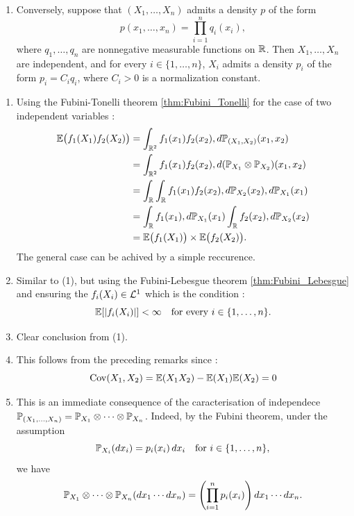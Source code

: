 \documentclass[../Main.tex]{subfiles}
\begin{document}
{\begin{enumerate}
\item Conversely, suppose that $(X_1,\dots,X_n)$ admits a density $p$ of the form
\[ p(x_1,\dots,x_n)=\prod_{i=1}^n q_i(x_i), \]
where $q_1,\dots,q_n$ are nonnegative measurable functions on $\mathbb{R}$. Then $X_1,\dots,X_n$ are independent, and for every $i\in\{1,\dots,n\}$, $X_i$ admits a density $p_i$ of the form $p_i=C_i q_i$, where $C_i>0$ is a normalization constant.
\end{enumerate}
}{
\begin{enumerate}
    \item  Using the Fubini-Tonelli theorem \ref{thm:Fubini_Tonelli} for the case of two independent variables : 
    \begin{align*}
    \mathbb{E}\bigl(f_1(X_1)f_2(X_2)\bigr)
            &= \int_{\mathbb{R}^2} f_1(x_1)f_2(x_2), d\mathbb{P}_{(X_1,X_2)}(x_1,x_2) \\
            &= \int_{\mathbb{R}^2} f_1(x_1)f_2(x_2), d(\mathbb{P}_{X_1}\otimes \mathbb{P}_{X_2})(x_1,x_2) \\
            &= \int_{\mathbb{R}} \int_{\mathbb{R}} f_1(x_1)f_2(x_2), d\mathbb{P}_{X_2}(x_2), d\mathbb{P}_{X_1}(x_1) \\
            &= \int_{\mathbb{R}} f_1(x_1), d\mathbb{P}_{X_1}(x_1)
            \int_{\mathbb{R}} f_2(x_2), d\mathbb{P}_{X_2}(x_2) \\
            &= \mathbb{E}\bigl(f_1(X_1)\bigr)\times \mathbb{E}\bigl(f_2(X_2)\bigr).
    \end{align*}
    The general case can be achived by a simple reccurence. 
    \item Similar to (1), but using the Fubini-Lebesgue theorem \ref{thm:Fubini_Lebesgue} and ensuring the $f_i(X_i)\in \mathcal{L}^1$ which is the condition :
    \[ \mathbb{E}[|f_i(X_i)|]<\infty \quad\text{for every } i\in\{1,\dots,n\}. \]
    \item Clear conclusion from (1). 
    \item This follows from the preceding remarks since :
    \[ \operatorname{Cov}(X_1,X_2) = \mathbb{E}(X_1X_2) - \mathbb{E}(X_1)\mathbb{E}(X_2) = 0 \] 
    \item This is an immediate consequence of the caracterisation of independece $\mathbb{P}_{(X_1,\ldots,X_n)} = \mathbb{P}_{X_1} \otimes \cdots \otimes \mathbb{P}_{X_n}$. Indeed, by the Fubini theorem, under the assumption
    \[ \mathbb{P}_{X_i}(dx_i) = p_i(x_i)\,dx_i \quad \text{for } i \in \{1,\ldots,n\}, \]
    we have
    \[ \mathbb{P}_{X_1} \otimes \cdots \otimes \mathbb{P}_{X_n}(dx_1\cdots dx_n) = \left( \prod_{i=1}^n p_i(x_i) \right) dx_1\cdots dx_n. \]


\end{enumerate}}
\end{document}
